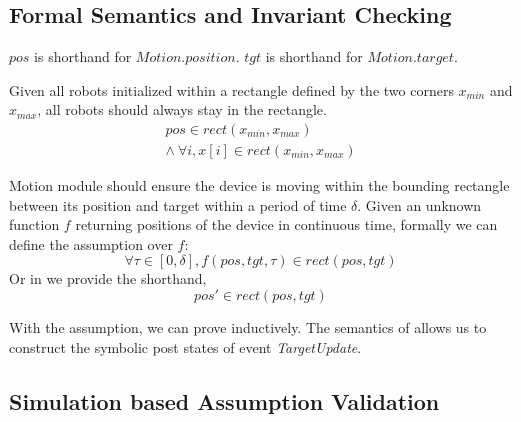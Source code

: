 \subsection{Formal Semantics and Invariant Checking}

$pos$ is shorthand for $Motion.position$. $tgt$ is shorthand for $Motion.target$.

\begin{invariant}\label{inv:lineform}
Given all robots initialized within a rectangle defined by the two corners $x_{min}$ and $x_{max}$,
all robots should always stay in the rectangle.
\[
\begin{split}
    pos \in rect(x_{min}, x_{max})        \\
    \land\ \forall i, x[i] \in rect(x_{min}, x_{max})
\end{split}
\]
\end{invariant}


\begin{assumption}\label{lineform-assume}
Motion module should ensure the device is moving within the bounding rectangle between its position and target
within a period of time $\delta$.
Given an unknown function $f$ returning positions of the device in continuous time,
formally we can define the assumption over $f$:
\[
\forall \tau \in [0, \delta], f(pos, tgt, \tau) \in rect(pos, tgt)
\]
Or in \lgname we provide the shorthand,
\[
pos' \in rect(pos, tgt)
\]
\end{assumption}

With the assumption, we can prove  inductively.
The \K semantics of \lgname allows us to construct the symbolic post states of event \emph{TargetUpdate}.


\begin{figure}
\end{figure}


\subsection{Simulation based Assumption Validation}

